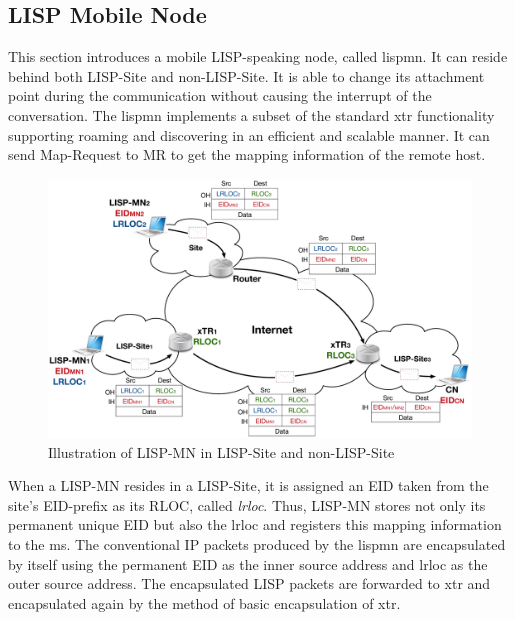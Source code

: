 \subsection{LISP Mobile Node}
\label{subsec:lispMN}
This section introduces a mobile LISP-speaking node, called \acrfull{lispmn}. It can reside behind both LISP-Site and non-LISP-Site. It is able to change its attachment point during the communication without causing the interrupt of the conversation. The \acrshort{lispmn} implements a subset of the standard \acrshort{xtr} functionality~\cite{mn00} supporting roaming and discovering in an efficient and scalable manner. It can send Map-Request to MR to get the mapping information of the remote host.

\begin{figure}[!t]
	\centering
	\includegraphics[width=\textwidth]{Pics/LISP-MN_archi.eps}
	\caption{Illustration of LISP-MN in LISP-Site and non-LISP-Site}
	\label{LISP_archi_2encap}
\end{figure}
When a LISP-MN resides in a LISP-Site, it is assigned an EID taken from the site's EID-prefix as its RLOC, called \emph{\acrfull{lrloc}}. Thus, LISP-MN stores not only its permanent unique EID but also the \acrshort{lrloc} and registers this mapping information to the \acrshort{ms}. The conventional IP packets produced by the \acrshort{lispmn} are encapsulated by itself using the permanent EID as the inner source address and \acrshort{lrloc} as the outer source address. The encapsulated LISP packets are forwarded to \acrshort{xtr} and encapsulated again by the method of basic encapsulation of \acrshort{xtr}. %

